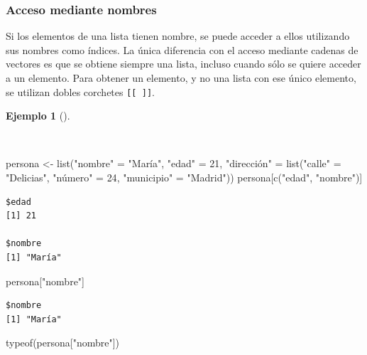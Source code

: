\documentclass[
  a4paper,
]{scrreport}
\newenvironment{Shaded}{\begin{snugshade}}{\end{snugshade}}
\newcommand{\DecValTok}[1]{\textcolor[rgb]{0.68,0.00,0.00}{#1}}
\newcommand{\FunctionTok}[1]{\textcolor[rgb]{0.28,0.35,0.67}{#1}}
\newcommand{\NormalTok}[1]{\textcolor[rgb]{0.00,0.23,0.31}{#1}}
\newcommand{\OtherTok}[1]{\textcolor[rgb]{0.00,0.23,0.31}{#1}}
\newcommand{\StringTok}[1]{\textcolor[rgb]{0.13,0.47,0.30}{#1}}
\theoremstyle{definition}
\theoremstyle{definition}
\newtheorem{example}{Ejemplo}[chapter]
\theoremstyle{remark}
\begin{document}
\subsubsection{Acceso mediante nombres}\label{acceso-mediante-nombres}

Si los elementos de una lista tienen nombre, se puede acceder a ellos
utilizando sus nombres como índices. La única diferencia con el acceso
mediante cadenas de vectores es que se obtiene siempre una lista,
incluso cuando sólo se quiere acceder a un elemento. Para obtener un
elemento, y no una lista con ese único elemento, se utilizan dobles
corchetes \texttt{{[}{[}\ {]}{]}}.

\begin{example}[]\protect\hypertarget{exm-acceso-listas-nombres}{}\label{exm-acceso-listas-nombres}

~

\begin{Shaded}
\begin{Highlighting}[]
\NormalTok{persona }\OtherTok{\textless{}{-}} \FunctionTok{list}\NormalTok{(}\StringTok{"nombre"} \OtherTok{=} \StringTok{"María"}\NormalTok{, }\StringTok{"edad"} \OtherTok{=} \DecValTok{21}\NormalTok{, }\StringTok{"dirección"} \OtherTok{=} \FunctionTok{list}\NormalTok{(}\StringTok{"calle"} \OtherTok{=} \StringTok{"Delicias"}\NormalTok{, }\StringTok{"número"} \OtherTok{=} \DecValTok{24}\NormalTok{, }\StringTok{"municipio"} \OtherTok{=} \StringTok{"Madrid"}\NormalTok{))}
\NormalTok{persona[}\FunctionTok{c}\NormalTok{(}\StringTok{"edad"}\NormalTok{, }\StringTok{"nombre"}\NormalTok{)]}
\end{Highlighting}
\end{Shaded}

\begin{verbatim}
$edad
[1] 21

$nombre
[1] "María"
\end{verbatim}

\begin{Shaded}
\begin{Highlighting}[]
\NormalTok{persona[}\StringTok{"nombre"}\NormalTok{]}
\end{Highlighting}
\end{Shaded}

\begin{verbatim}
$nombre
[1] "María"
\end{verbatim}

\begin{Shaded}
\begin{Highlighting}[]
\FunctionTok{typeof}\NormalTok{(persona[}\StringTok{"nombre"}\NormalTok{])}
\end{Highlighting}
\end{Shaded}


\end{example}
\end{document}
